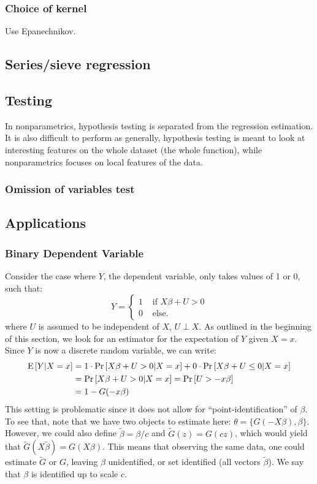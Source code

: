 \subsubsection{Choice of kernel}

Use Epanechnikov.

\subsection{Series/sieve regression}



\subsection{Testing}

In nonparametrics, hypothesis testing is separated from the regression estimation. It is also difficult to perform as generally, hypothesis testing is meant to look at interesting features on the whole dataset (the whole function), while nonparametrics focuses on local features of the data.

\subsubsection{Omission of variables test}

\subsection{Applications}

\subsubsection{Binary Dependent Variable}

Consider the case where $Y$, the dependent variable, only takes values of 1 or 0, such that: $$Y = \begin{cases}
1 & \text{ if } X\beta + U > 0 \\
0 & \text{ else.}
\end{cases}
$$ where $U$ is assumed to be independent of $X$, $U\perp X$.
As outlined in the beginning of this section, we look for an estimator for the expectation of $Y$ given $X = x$. Since $Y$ is now a discrete random variable, we can write: \begin{align*}
\operatorname{E}\left[Y\vert X = x\right] & = 1 \cdot \operatorname{Pr}\left[X\beta + U > 0\vert X = x\right] + 0 \cdot \operatorname{Pr}\left[X\beta + U \leq 0\vert X = x\right] \\
& = \operatorname{Pr}\left[X\beta + U > 0 \vert X = x\right] = \operatorname{Pr}\left[U > -x\beta\right]\\
& = 1 - G(-x\beta)
\end{align*}
This setting is problematic since it does not allow for ``point-identification'' of $\beta$. To see that, note that we have two objects to estimate here: $\theta = \{G(-X\beta), \beta\}$. However, we could also define $\tilde\beta = \beta/c$ and $\tilde G(z) = G(cz)$, which would yield that $\tilde G(X\tilde\beta) = G(X\beta)$. This means that observing the same data, one could estimate $\tilde G$ or $G$, leaving $\beta$ unidentified, or set identified (all vectors $\tilde\beta$). We say that $\beta$ is identified up to scale $c$.

